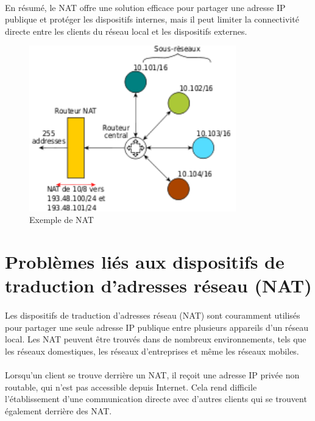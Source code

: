 \paragraph{}
En résumé, le NAT offre une solution efficace pour partager une adresse IP publique et protéger les dispositifs internes, mais il peut limiter la connectivité directe entre les clients du réseau local et les dispositifs externes.


\begin{figure}[h]
\centering
\includegraphics[width=0.8\textwidth]{assets/nat.png}
\caption{Exemple de NAT}
\end{figure}

\newpage

\section{Problèmes liés aux dispositifs de traduction d'adresses réseau (NAT)}

\paragraph{}
Les dispositifs de traduction d'adresses réseau (NAT) sont couramment utilisés pour partager une seule adresse IP publique entre plusieurs appareils d'un réseau local. Les NAT 
peuvent être trouvés dans de nombreux environnements, tels que les réseaux domestiques, les réseaux d'entreprises et même les réseaux mobiles.

\paragraph{}
Lorsqu'un client se trouve derrière un NAT, il reçoit une adresse IP privée non routable, qui n'est pas accessible depuis Internet. Cela rend difficile l'établissement 
d'une communication directe avec d'autres clients qui se trouvent également derrière des NAT.

